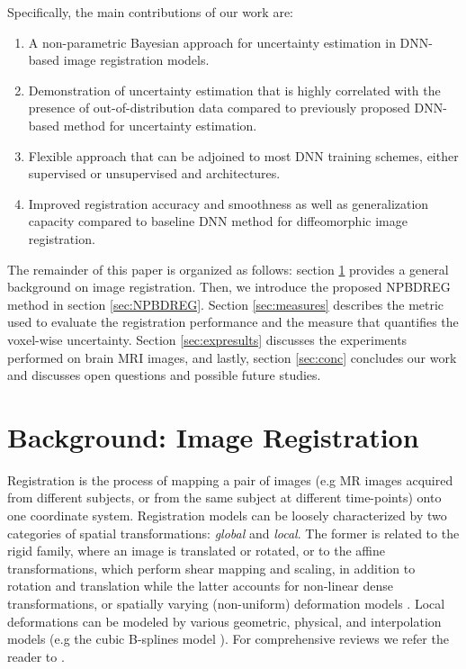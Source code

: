 \documentclass[preprint,authoryear]{elsarticle}
\begin{document}
Specifically, the main contributions of our work are:
\begin{enumerate}
    \item A non-parametric Bayesian approach for uncertainty estimation in DNN-based image registration models.
    \item Demonstration of uncertainty estimation that is highly correlated with the presence of out-of-distribution data compared to previously proposed DNN-based method for uncertainty estimation.
    \item Flexible approach that can be adjoined to most DNN training schemes, either supervised or unsupervised and architectures.
    \item Improved registration accuracy and smoothness as well as generalization capacity compared to baseline DNN method for diffeomorphic image registration. 
\end{enumerate}

The remainder of this paper is organized as follows: section \ref{sec:back} provides a general background on image registration. Then, we introduce the proposed NPBDREG method in section \ref{sec:NPBDREG}. Section \ref{sec:measures} describes the metric used to evaluate the registration performance and the measure that quantifies the voxel-wise uncertainty. Section \ref{sec:expresults} discusses the experiments performed on brain MRI images, and lastly, section \ref{sec:conc} concludes our work and discusses open questions and possible future studies.


\section{Background: Image Registration}\label{sec:back}
 Registration is the process of mapping a pair of images (e.g MR images acquired from different subjects, or from the same subject at different time-points) onto one coordinate system. Registration models can be loosely characterized by two categories of spatial transformations: \textit{global} and \textit{local}. The former is related to the rigid family, where an image is translated or rotated, or to the affine transformations, which perform shear mapping and scaling, in addition to rotation and translation while the latter accounts for non-linear dense transformations, or spatially varying (non-uniform) deformation models \cite{sotiras2013deformable}. Local deformations can be modeled by various geometric, physical, and interpolation models (e.g the cubic B-splines model \cite{rueckert1999nonrigid}). For comprehensive reviews we refer the reader to \cite{haber2004numerical,sotiras2013deformable}.
 
\end{document}
